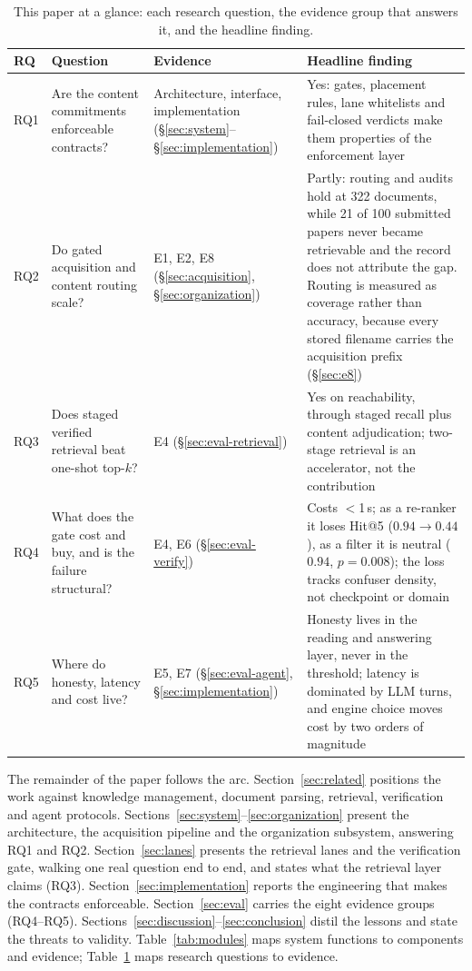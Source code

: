 \begin{table}[!htbp]
\centering
\footnotesize
\setlength{\tabcolsep}{3pt}
\caption{This paper at a glance: each research question, the evidence group
that answers it, and the headline finding.}
\label{tab:ataglance}
\begin{tabular}{p{0.8cm}p{3.7cm}p{2.9cm}p{4.9cm}}
\toprule
RQ & Question & Evidence & Headline finding \\
\midrule
RQ1 & Are the content commitments enforceable contracts? &
Architecture, interface, implementation
(\S\ref{sec:system}--\S\ref{sec:implementation}) & Yes: gates, placement
rules, lane whitelists and fail-closed verdicts make them properties of the
enforcement layer \\
RQ2 & Do gated acquisition and content routing scale? &
E1, E2, E8 (\S\ref{sec:acquisition}, \S\ref{sec:organization}) & Partly: routing
and audits hold at 322 documents, while 21 of 100 submitted papers never
became retrievable and the record does not attribute the gap. Routing is
measured as coverage rather than accuracy, because every stored filename
carries the acquisition prefix (\S\ref{sec:e8}) \\
RQ3 & Does staged verified retrieval beat one-shot top-$k$? &
E4 (\S\ref{sec:eval-retrieval}) & Yes on reachability, through staged
recall plus content adjudication; two-stage retrieval is an accelerator, not
the contribution \\
RQ4 & What does the gate cost and buy, and is the failure structural? &
E4, E6 (\S\ref{sec:eval-verify}) & Costs $<$1\,s; as a re-ranker it loses
Hit@5 ($0.94\!\to\!0.44$), as a filter it is neutral ($0.94$,
$p=0.008$); the loss tracks confuser density, not checkpoint or domain \\
RQ5 & Where do honesty, latency and cost live? &
E5, E7 (\S\ref{sec:eval-agent}, \S\ref{sec:implementation}) & Honesty lives
in the reading and answering layer, never in the threshold; latency is
dominated by LLM turns, and engine choice moves cost by two orders of
magnitude \\
\bottomrule
\end{tabular}
\end{table}

The remainder of the paper follows the arc.
Section~\ref{sec:related} positions the work against knowledge management,
document parsing, retrieval, verification and agent protocols.
Sections~\ref{sec:system}--\ref{sec:organization} present the architecture,
the acquisition pipeline and the organization subsystem, answering RQ1 and
RQ2. Section~\ref{sec:lanes} presents the retrieval lanes and the verification
gate, walking one real question end to end, and states what the retrieval layer
claims (RQ3). Section~\ref{sec:implementation} reports the engineering that
makes the contracts enforceable. Section~\ref{sec:eval} carries the eight
evidence groups (RQ4--RQ5).
Sections~\ref{sec:discussion}--\ref{sec:conclusion} distil the lessons and
state the threats to validity. Table~\ref{tab:modules} maps system functions
to components and evidence; Table~\ref{tab:ataglance} maps research questions
to evidence.
